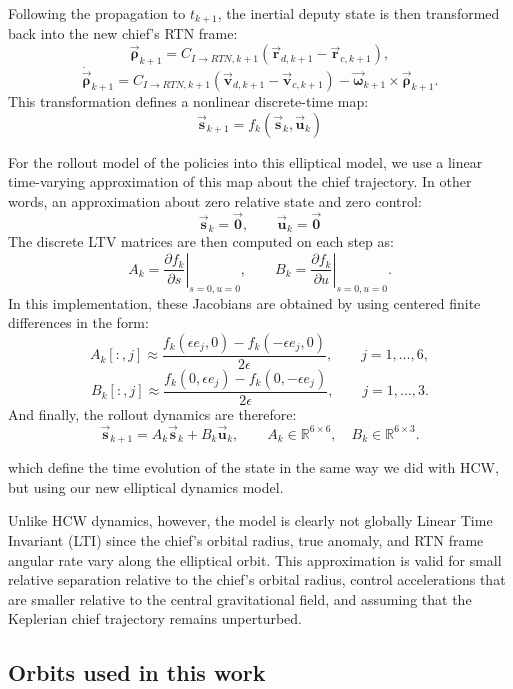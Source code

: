 Following the propagation to $t_{k+1}$, the inertial deputy state is then transformed back into the new chief's RTN frame:
\[
\vec{\boldsymbol{\rho}}_{k+1}
=
C_{I\to RTN,k+1}
\left(
\vec{\boldsymbol{r}}_{d,k+1}-\vec{\boldsymbol{r}}_{c,k+1}
\right),
\]
\[
\dot{\vec{\boldsymbol{\rho}}}_{k+1}
=
C_{I\to RTN,k+1}
\left(
\vec{\boldsymbol{v}}_{d,k+1}-\vec{\boldsymbol{v}}_{c,k+1}
\right)
-
\vec{\boldsymbol{\omega}}_{k+1}\times \vec{\boldsymbol{\rho}}_{k+1}.
\]
This transformation defines a nonlinear discrete-time map:
\[
\vec{\mathbf{s}}_{k+1} = f_k(\vec{\mathbf{s}}_k, \vec{\mathbf{u}}_k)
\]


For the rollout model of the policies into this elliptical model, we use a linear time-varying approximation of this map about the chief trajectory. In other words, an approximation about zero relative state and zero control:
\[
\vec{\mathbf{s}}_k = \vec{\mathbf{0}},
\qquad
\vec{\mathbf{u}}_k = \vec{\mathbf{0}}
\]
The discrete LTV matrices are then computed on each step as:
\[
A_k
=
\left.
\frac{\partial f_k}{\partial s}
\right|_{s=0,u=0},
\qquad
B_k
=
\left.
\frac{\partial f_k}{\partial u}
\right|_{s=0,u=0}.
\]
In this implementation, these Jacobians are obtained by using centered finite differences in the form:
\[
A_k[:,j]
\approx
\frac{
f_k(\epsilon e_j,0) - f_k(-\epsilon e_j,0)
}{2\epsilon},
\qquad
j=1,\ldots,6,
\]
\[
B_k[:,j]
\approx
\frac{
f_k(0,\epsilon e_j) - f_k(0,-\epsilon e_j)
}{2\epsilon},
\qquad
j=1,\ldots,3.
\]
And finally, the rollout dynamics are therefore:
\[
\vec{\mathbf{s}}_{k+1} = A_k\vec{\mathbf{s}}_k + B_k\vec{\mathbf{u}}_k,
\qquad
A_k \in \mathbb{R}^{6\times 6},
\quad
B_k \in \mathbb{R}^{6\times 3}.
\]

which define the time evolution of the state in the same way we did with HCW, but using our new elliptical dynamics model.

Unlike HCW dynamics, however, the model is clearly not globally Linear Time Invariant (LTI) since the chief's orbital radius, true anomaly, and RTN frame angular rate vary along the elliptical orbit. This approximation is valid for small relative separation relative to the chief's orbital radius, control accelerations that are smaller relative to the central gravitational field, and assuming that the Keplerian chief trajectory remains unperturbed.

\subsection{Orbits used in this work}
\label{subsec:dynamics-orbits-used}


